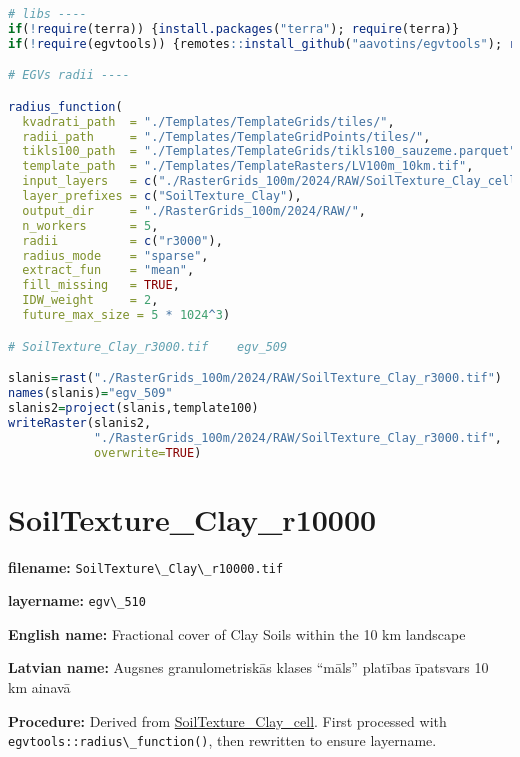 \documentclass[
]{book}
\newcommand{\passthrough}[1]{#1}
\begin{document}
\begin{lstlisting}[language=R]
# libs ----
if(!require(terra)) {install.packages("terra"); require(terra)}
if(!require(egvtools)) {remotes::install_github("aavotins/egvtools"); require(egvtools)}

# EGVs radii ----

radius_function(
  kvadrati_path  = "./Templates/TemplateGrids/tiles/",
  radii_path     = "./Templates/TemplateGridPoints/tiles/",
  tikls100_path  = "./Templates/TemplateGrids/tikls100_sauzeme.parquet",
  template_path  = "./Templates/TemplateRasters/LV100m_10km.tif",
  input_layers   = c("./RasterGrids_100m/2024/RAW/SoilTexture_Clay_cell.tif"),
  layer_prefixes = c("SoilTexture_Clay"),
  output_dir     = "./RasterGrids_100m/2024/RAW/",
  n_workers      = 5,
  radii          = c("r3000"),
  radius_mode    = "sparse",
  extract_fun    = "mean",
  fill_missing   = TRUE,
  IDW_weight     = 2,
  future_max_size = 5 * 1024^3)

# SoilTexture_Clay_r3000.tif    egv_509

slanis=rast("./RasterGrids_100m/2024/RAW/SoilTexture_Clay_r3000.tif")
names(slanis)="egv_509"
slanis2=project(slanis,template100)
writeRaster(slanis2,
            "./RasterGrids_100m/2024/RAW/SoilTexture_Clay_r3000.tif",
            overwrite=TRUE)
\end{lstlisting}

\section{SoilTexture\_Clay\_r10000}\label{ch06.510}

\textbf{filename:} \passthrough{\lstinline!SoilTexture\_Clay\_r10000.tif!}

\textbf{layername:} \passthrough{\lstinline!egv\_510!}

\textbf{English name:} Fractional cover of Clay Soils within the 10 km landscape

\textbf{Latvian name:} Augsnes granulometriskās klases ``māls'' platības īpatsvars 10 km ainavā

\textbf{Procedure:} Derived from \hyperref[ch06.506]{SoilTexture\_Clay\_cell}. First processed
with \passthrough{\lstinline!egvtools::radius\_function()!}, then rewritten to ensure layername.
\end{document}
